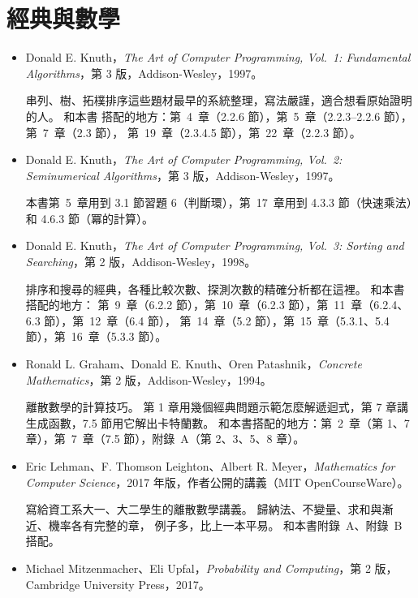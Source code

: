 \section*{經典與數學}

\begin{itemize}
\item Donald E. Knuth，\textit{The Art of Computer Programming, Vol.~1: Fundamental
Algorithms}，第 3 版，Addison-Wesley，1997。

串列、樹、拓樸排序這些題材最早的系統整理，寫法嚴謹，適合想看原始證明的人。 和本書
搭配的地方：第~4~章（2.2.6 節），第~5~章（2.2.3--2.2.6 節），第~7~章（2.3 節），
第~19~章（2.3.4.5 節），第~22~章（2.2.3 節）。

\item Donald E. Knuth，\textit{The Art of Computer Programming, Vol.~2: Seminumerical
Algorithms}，第 3 版，Addison-Wesley，1997。

本書第~5~章用到 3.1 節習題 6（判斷環），第~17~章用到 4.3.3 節（快速乘法）和 4.6.3 節（冪的計算）。

\item Donald E. Knuth，\textit{The Art of Computer Programming, Vol.~3: Sorting and
Searching}，第 2 版，Addison-Wesley，1998。

排序和搜尋的經典，各種比較次數、探測次數的精確分析都在這裡。 和本書搭配的地方：
第~9~章（6.2.2 節），第~10~章（6.2.3 節），第~11~章（6.2.4、6.3 節），第~12~章（6.4 節），
第~14~章（5.2 節），第~15~章（5.3.1、5.4 節），第~16~章（5.3.3 節）。

\item Ronald L. Graham、Donald E. Knuth、Oren Patashnik，\textit{Concrete
Mathematics}，第 2 版，Addison-Wesley，1994。

離散數學的計算技巧。 第 1 章用幾個經典問題示範怎麼解遞迴式，第 7 章講生成函數，7.5
節用它解出卡特蘭數。 和本書搭配的地方：第~2~章（第 1、7 章），第~7~章（7.5 節），附錄~A（第 2、3、5、8 章）。

\item Eric Lehman、F. Thomson Leighton、Albert R. Meyer，\textit{Mathematics for Computer
Science}，2017 年版，作者公開的講義（MIT OpenCourseWare）。

寫給資工系大一、大二學生的離散數學講義。 歸納法、不變量、求和與漸近、機率各有完整的章，
例子多，比上一本平易。 和本書附錄~A、附錄~B 搭配。

\item Michael Mitzenmacher、Eli Upfal，\textit{Probability and Computing}，第 2 版，
Cambridge University Press，2017。


\end{itemize}
